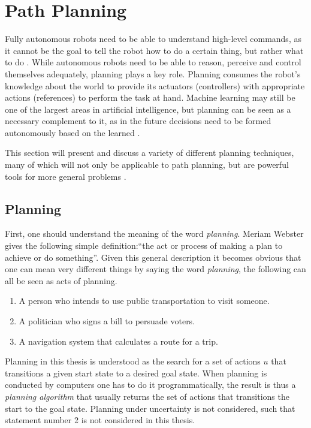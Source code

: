 \chapter{Path Planning}
\label{chap:pathPlanning}
Fully autonomous robots need to be able to understand high-level commands, as it cannot be the goal to tell the robot how to do a certain thing, but rather what to do \cite{Latombe.1991}. While autonomous robots need to be able to reason, perceive and control themselves adequately, planning plays a key role. Planning consumes the robot's knowledge about the world to provide its actuators (controllers) with appropriate actions (references) to perform the task at hand. Machine learning may still be one of the largest areas in artificial intelligence, but planning can be seen as a necessary complement to it, as in the future decisions need to be formed autonomously based on the learned \cite{LaValle.2006}. 

This section will present and discuss a variety of different planning techniques, many of which will not only be applicable to path planning, but are powerful tools for more general problems \cite{LaValle.2006}.

\section{Planning}
First, one should understand the meaning of the word \emph{planning}. Meriam Webster gives the following simple definition:``the act or process of making a plan to achieve or do something''. Given this general description it becomes obvious that one can mean very different things by saying the word  \emph{planning}, the following can all be seen as acts of planning.
\begin{enumerate}
	\item A person who intends to use public transportation to visit someone.
	\item A politician who signs a bill to persuade voters.
	\item A navigation system that calculates a route for a trip.
\end{enumerate}

Planning in this thesis is understood as the search for a set of actions $u$ that transitions a given start state to a desired goal state. When planning is conducted by computers one has to do it programmatically, the result is thus a \emph{planning algorithm} that usually returns the set of actions that transitions the start to the goal state. Planning under uncertainty is not considered, such that statement number 2 is not considered in this thesis.

